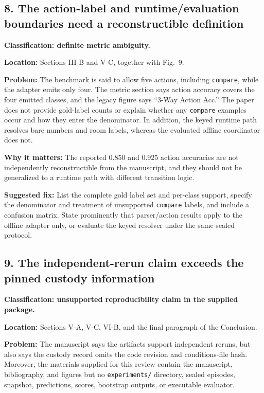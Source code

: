 \documentclass[11pt]{article}
\begin{document}
\subsection*{8. The action-label and runtime/evaluation boundaries need a reconstructible definition}

\textbf{Classification: definite metric ambiguity.}

\textbf{Location:} Sections III-B and V-C, together with Fig.~9.

\textbf{Problem:} The benchmark is said to allow five actions, including \texttt{compare}, while the adapter emits only four.  The metric section says action accuracy covers the four emitted classes, and the legacy figure says ``3-Way Action Acc.''  The paper does not provide gold-label counts or explain whether any \texttt{compare} examples occur and how they enter the denominator.  In addition, the keyed runtime path resolves bare numbers and room labels, whereas the evaluated offline coordinator does not.

\textbf{Why it matters:} The reported 0.850 and 0.925 action accuracies are not independently reconstructible from the manuscript, and they should not be generalized to a runtime path with different transition logic.

\textbf{Suggested fix:} List the complete gold label set and per-class support, specify the denominator and treatment of unsupported \texttt{compare} labels, and include a confusion matrix.  State prominently that parser/action results apply to the offline adapter only, or evaluate the keyed resolver under the same sealed protocol.

\subsection*{9. The independent-rerun claim exceeds the pinned custody information}

\textbf{Classification: unsupported reproducibility claim in the supplied package.}

\textbf{Location:} Sections V-A, V-C, VI-B, and the final paragraph of the Conclusion.

\textbf{Problem:} The manuscript says the artifacts support independent reruns, but also says the custody record omits the code revision and conditions-file hash.  Moreover, the materials supplied for this review contain the manuscript, bibliography, and figures but no \texttt{experiments/} directory, sealed episodes, snapshot, predictions, scores, bootstrap outputs, or executable evaluator.
\end{document}
